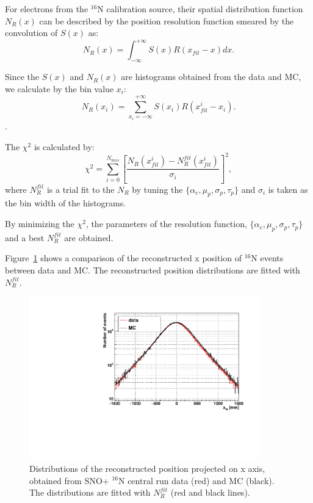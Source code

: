\documentclass[preprint,12pt]{elsarticle}
\numberwithin{equation}{section}
\begin{document}
For electrons from the $^{16}$N calibration source, their spatial distribution function $N_{R}(x)$ can be described by the position resolution function smeared by the convolution of $S(x)$ as\cite{boulay}:
\[
  N_{R}(x)=\int^{+\infty}_{-\infty} S(x)R(x_{fit}-x)dx.
\]

Since the $S(x)$ and $N_{R}(x)$ are histograms obtained from the data and MC, we calculate by the bin value $x_i$: 
\[N_R(x_i)=\sum_{x_i=-\infty}^{+\infty}S(x_i)R(x_{fit}^i-x_i).\].

The $\chi^2$ is calculated by:
\[
  \chi^2=\sum^{N_{bins}}_{i=0}[\frac{N_R(x_{fit}^i)-N_R^{fit}(x_{fit}^i)}{\sigma_i}]^2,
\]
where $N_R^{fit}$ is a trial fit to the $N_R$ by tuning the $\{\alpha_e,\mu_p,\sigma_p,\tau_p\}$ and $\sigma_i$ is taken as the bin width of the histograms.

By minimizing the $\chi^2$, the parameters of the resolution function, $\{\alpha_e,\mu_p,\sigma_p,\tau_p\}$ and a best $N_R^{fit}$ are obtained.

Figure~\ref{posresol} shows a comparison of the reconstructed x position of {$^{16}$}N events between data and MC. The reconstructed position distributions are fitted with $N_R^{fit}$.

\begin{figure}[!htb]
	\centering
	\includegraphics[width=10cm]{posResol.pdf}
	\caption{Distributions of the reconstructed position projected on x axis, obtained from SNO+ {$^{16}$}N central run data (red) and MC (black). The distributions are fitted with $N_R^{fit}$ (red and black lines).}
	\label{posresol}
\end{figure}
\end{document}
